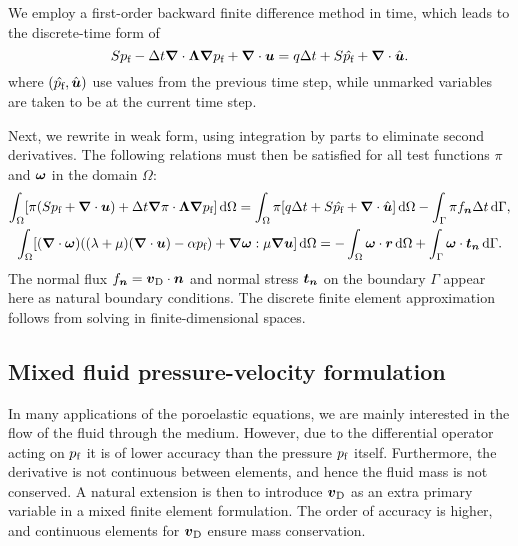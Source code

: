We employ a first-order backward finite difference method in time, which leads
to the discrete-time form of 
%
\begin{equation}
  \label{eq:time1}
  S \Pf - \Delta t\nabla \cdot \Lambda \nabla \Pf
  +  \nabla \cdot \U = q\Delta t + S \prev{\Pf} + \nabla \cdot \prev{\U}.
\end{equation}
%
where $(\hat{p_{\text{f}}},\hat{\boldsymbol{u}})$ use values from the previous time step,
while unmarked variables are taken to be at the current time step.

Next, we rewrite  in
weak form, using integration by parts to eliminate second derivatives.
The following relations must then be satisfied for all test functions $\pi$ and
$\boldsymbol{\omega}$ in the domain $\Omega$:
%
\begin{gather}
  \label{eq:weakpress}
  \int_\Omega [
    \pi(
  S \Pf
  + \nabla \cdot \U)
  + \Delta t \nabla\pi \cdot \Lambda \nabla \Pf
  ] \D\Omega 
  = \int_\Omega \pi[
    q \Delta t
  + S \prev{\Pf}
  + \nabla \cdot \prev{\U}] \D\Omega
-\int_\Gamma \pi f_{\V{n}}\Delta t \D\Gamma,\\
%
\label{eq:weakdispl}
  \int_\Omega [
  (\nabla\cdot\V{\omega})((\lambda+\mu)(\nabla\cdot\U)
  -\alpha \Pf)
  +\nabla \V{\omega} : \mu  \nabla \U
  ] \D\Omega =
 - \int_\Omega \V{\omega} \cdot \V{r} \D\Omega + \int_\Gamma \V{\omega}
  \cdot \V{t}_{\V{n}} \D\Gamma.
\end{gather}
%
The normal flux $f_{\boldsymbol{n}}=\boldsymbol{v}_{\text{D}}\cdot\boldsymbol{n}$ and normal stress $\boldsymbol{t}_{\boldsymbol{n}}$ on the boundary
$\Gamma$ appear here as natural boundary conditions. 
The discrete finite element approximation follows from solving
 in finite-dimensional spaces.

\subsection{Mixed fluid pressure-velocity formulation}

In many applications of the poroelastic equations, we are mainly interested in
the flow of the fluid through the medium.
However, due to the differential operator acting on $p_{\text{f}}$ it is of lower accuracy than
the pressure $p_{\text{f}}$ itself.
Furthermore, the derivative is not continuous between elements, and hence the
fluid mass is not conserved.
A natural extension is then to introduce $\boldsymbol{v}_{\text{D}}$ as an extra primary variable in a mixed
finite element formulation.
The order of accuracy is higher, and continuous elements for $\boldsymbol{v}_{\text{D}}$ ensure mass
conservation.

